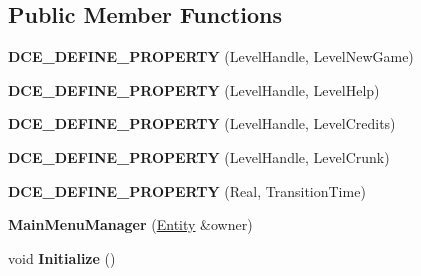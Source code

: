 \subsection*{Public Member Functions}
\begin{DoxyCompactItemize}
\item 
\hypertarget{classDCEngine_1_1Components_1_1MainMenuManager_a223224cab9d0fd68ea6c473b2f5ec0f3}{{\bfseries D\-C\-E\-\_\-\-D\-E\-F\-I\-N\-E\-\_\-\-P\-R\-O\-P\-E\-R\-T\-Y} (Level\-Handle, Level\-New\-Game)}\label{classDCEngine_1_1Components_1_1MainMenuManager_a223224cab9d0fd68ea6c473b2f5ec0f3}

\item 
\hypertarget{classDCEngine_1_1Components_1_1MainMenuManager_a2a90df843daf8a86d9b5d120d88342ca}{{\bfseries D\-C\-E\-\_\-\-D\-E\-F\-I\-N\-E\-\_\-\-P\-R\-O\-P\-E\-R\-T\-Y} (Level\-Handle, Level\-Help)}\label{classDCEngine_1_1Components_1_1MainMenuManager_a2a90df843daf8a86d9b5d120d88342ca}

\item 
\hypertarget{classDCEngine_1_1Components_1_1MainMenuManager_ada5d527ac978982f74c79b63da274c33}{{\bfseries D\-C\-E\-\_\-\-D\-E\-F\-I\-N\-E\-\_\-\-P\-R\-O\-P\-E\-R\-T\-Y} (Level\-Handle, Level\-Credits)}\label{classDCEngine_1_1Components_1_1MainMenuManager_ada5d527ac978982f74c79b63da274c33}

\item 
\hypertarget{classDCEngine_1_1Components_1_1MainMenuManager_a2f90ba26d9f12a0e46dc4d105d532c55}{{\bfseries D\-C\-E\-\_\-\-D\-E\-F\-I\-N\-E\-\_\-\-P\-R\-O\-P\-E\-R\-T\-Y} (Level\-Handle, Level\-Crunk)}\label{classDCEngine_1_1Components_1_1MainMenuManager_a2f90ba26d9f12a0e46dc4d105d532c55}

\item 
\hypertarget{classDCEngine_1_1Components_1_1MainMenuManager_a440becde7b08ec35d93f41d2d7bdc36c}{{\bfseries D\-C\-E\-\_\-\-D\-E\-F\-I\-N\-E\-\_\-\-P\-R\-O\-P\-E\-R\-T\-Y} (Real, Transition\-Time)}\label{classDCEngine_1_1Components_1_1MainMenuManager_a440becde7b08ec35d93f41d2d7bdc36c}

\item 
\hypertarget{classDCEngine_1_1Components_1_1MainMenuManager_aed5225d86224ed18d0e461edac920b7e}{{\bfseries Main\-Menu\-Manager} (\hyperlink{classDCEngine_1_1Entity}{Entity} \&owner)}\label{classDCEngine_1_1Components_1_1MainMenuManager_aed5225d86224ed18d0e461edac920b7e}

\item 
\hypertarget{classDCEngine_1_1Components_1_1MainMenuManager_ad53f6784b5c9e8bb8c875d92176e9ceb}{void {\bfseries Initialize} ()}\label{classDCEngine_1_1Components_1_1MainMenuManager_ad53f6784b5c9e8bb8c875d92176e9ceb}


\end{DoxyCompactItemize}
